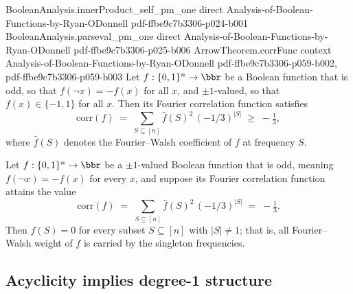\begin{lemma}
\proofstep
  {BooleanAnalysis.innerProduct_self_pm_one}
  {direct}
  {Analysis-of-Boolean-Functions-by-Ryan-ODonnell}
  {pdf-ffbe9c7b3306-p024-b001}
\proofstep
  {BooleanAnalysis.parseval_pm_one}
  {direct}
  {Analysis-of-Boolean-Functions-by-Ryan-ODonnell}
  {pdf-ffbe9c7b3306-p025-b006}
\proofstep
  {ArrowTheorem.corrFunc}
  {context}
  {Analysis-of-Boolean-Functions-by-Ryan-ODonnell}
  {pdf-ffbe9c7b3306-p059-b002,
    pdf-ffbe9c7b3306-p059-b003}
Let $f:\{0,1\}^n\to\bbr$ be a Boolean function that is odd, so that $f(\lnot x)=-f(x)$
for all $x$, and $\pm 1$-valued, so that $f(x)\in\{-1,1\}$ for all $x$. Then its Fourier
correlation function satisfies
\[
\mathrm{corr}(f) \;=\; \sum_{S\subseteq[n]} \hat f(S)^2\,(-1/3)^{|S|} \;\ge\; -\tfrac13,
\]
where $\hat f(S)$ denotes the Fourier--Walsh coefficient of $f$ at frequency $S$.
\end{lemma}

\begin{lemma}
\label{ArrowTheorem.corrFunc_eq_neg_third_of_weight_one}
\leanok
{}
Let $f:\{0,1\}^n\to\bbr$ be a $\pm 1$-valued Boolean function that is odd, meaning
$f(\lnot x)=-f(x)$ for every $x$, and suppose its Fourier correlation function attains
the value
\[
  \mathrm{corr}(f)\;=\;\sum_{S\subseteq[n]}\hat f(S)^2\,(-1/3)^{|S|}\;=\;-\tfrac13.
\]
Then $\hat f(S)=0$ for every subset $S\subseteq[n]$ with $|S|\neq 1$; that is, all
Fourier--Walsh weight of $f$ is carried by the singleton frequencies.
\end{lemma}

\subsection{Acyclicity implies degree-1 structure}


